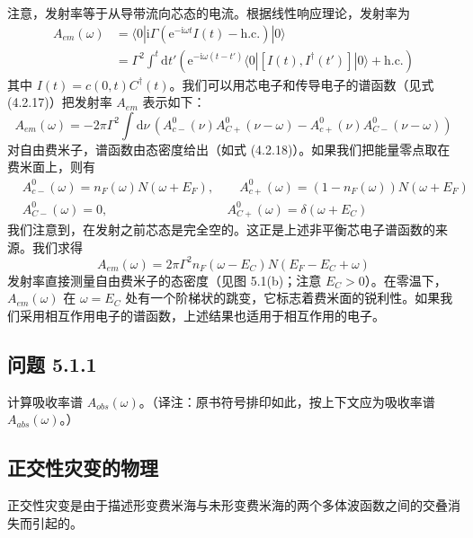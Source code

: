 注意，发射率等于从导带流向芯态的电流。根据线性响应理论，发射率为
\begin{align*}
A_{em}(\omega) &= \langle 0|\mathrm{i}\Gamma(\mathrm{e}^{-\mathrm{i}\omega t}I(t)-\text{h.c.})|0\rangle\\
&= \Gamma^2\int^t\mathrm{d}t'\left(\mathrm{e}^{-\mathrm{i}\omega(t-t')}\langle 0|[I(t),I^{\dagger}(t')]|0\rangle+\text{h.c.}\right)
\end{align*}
其中 $I(t)=c(0,t)C^{\dagger}(t)$。我们可以用芯电子和传导电子的谱函数（见式 (4.2.17)）把发射率 $A_{em}$ 表示如下：
\begin{equation*}
A_{em}(\omega)=-2\pi\Gamma^2\int\mathrm{d}\nu\,\left(A_{c-}^{0}(\nu)A_{C+}^{0}(\nu-\omega)-A_{c+}^{0}(\nu)A_{C-}^{0}(\nu-\omega)\right)
\end{equation*}
对自由费米子，谱函数由态密度给出（如式 (4.2.18)）。如果我们把能量零点取在费米面上，则有
\begin{align*}
&A_{c-}^{0}(\omega)=n_F(\omega)N(\omega+E_F),\qquad A_{c+}^{0}(\omega)=(1-n_F(\omega))N(\omega+E_F)\\
&A_{C-}^{0}(\omega)=0,\qquad\qquad\qquad\qquad\quad\ \ A_{C+}^{0}(\omega)=\delta(\omega+E_C)
\end{align*}
我们注意到，在发射之前芯态是完全空的。这正是上述非平衡芯电子谱函数的来源。我们求得
\begin{equation*}
A_{em}(\omega)=2\pi\Gamma^2n_F(\omega-E_C)N(E_F-E_C+\omega)
\end{equation*}
发射率直接测量自由费米子的态密度（见图 5.1(b)；注意 $E_C>0$）。在零温下，$A_{em}(\omega)$ 在 $\omega=E_C$ 处有一个阶梯状的跳变，它标志着费米面的锐利性。如果我们采用相互作用电子的谱函数，上述结果也适用于相互作用的电子。


\subsection*{问题 5.1.1}

计算吸收率谱 $A_{obs}(\omega)$。（译注：原书符号排印如此，按上下文应为吸收率谱 $A_{abs}(\omega)$。）

\subsection{正交性灾变的物理}

\begin{keypoints}
\item 正交性灾变是由于描述形变费米海与未形变费米海的两个多体波函数之间的交叠消失而引起的。
\end{keypoints}

